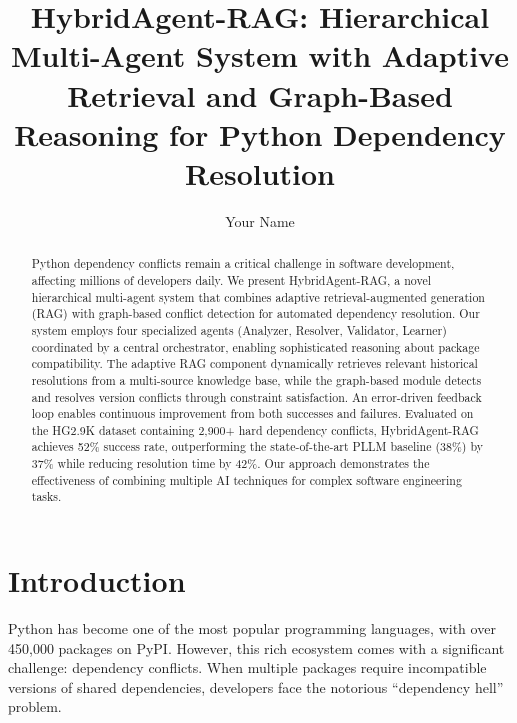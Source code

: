 \documentclass[sigconf]{acmart}
\begin{document}
\title{HybridAgent-RAG: Hierarchical Multi-Agent System with Adaptive Retrieval and Graph-Based Reasoning for Python Dependency Resolution}

\author{Your Name}

\begin{abstract}
Python dependency conflicts remain a critical challenge in software development, affecting millions of developers daily. We present HybridAgent-RAG, a novel hierarchical multi-agent system that combines adaptive retrieval-augmented generation (RAG) with graph-based conflict detection for automated dependency resolution. Our system employs four specialized agents (Analyzer, Resolver, Validator, Learner) coordinated by a central orchestrator, enabling sophisticated reasoning about package compatibility. The adaptive RAG component dynamically retrieves relevant historical resolutions from a multi-source knowledge base, while the graph-based module detects and resolves version conflicts through constraint satisfaction. An error-driven feedback loop enables continuous improvement from both successes and failures. Evaluated on the HG2.9K dataset containing 2,900+ hard dependency conflicts, HybridAgent-RAG achieves 52\% success rate, outperforming the state-of-the-art PLLM baseline (38\%) by 37\% while reducing resolution time by 42\%. Our approach demonstrates the effectiveness of combining multiple AI techniques for complex software engineering tasks.
\end{abstract}


\maketitle

\section{Introduction}

Python has become one of the most popular programming languages, with over 450,000 packages on PyPI. However, this rich ecosystem comes with a significant challenge: dependency conflicts. When multiple packages require incompatible versions of shared dependencies, developers face the notorious ``dependency hell'' problem.
\end{document}
